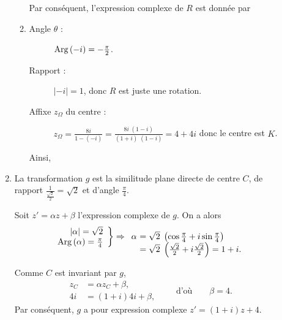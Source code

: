 \begin{description}
\begin{enumerate}
\begin{enumerate}
											Par cons\'equent, l'expression complexe de $R$ est donn\'ee par
									\item {}
												\begin{description}
													\item[Angle $\theta$ :] $\Arg{-i} = -\frac{\pi}{2}$.
													\item[Rapport :] $|-i| = 1$, donc $R$ est juste une rotation.
													\item[Affixe $z_\Omega$ du centre :]
														$z_\Omega = \frac{8i}{1-(-i)} = \frac{8i \; (1-i)}{(1+i)\;(1-i)} = 4 + 4i$
														donc le centre est $K$.
												\end{description}
												Ainsi, 
											
								\end{enumerate}
					\item {}
									La transformation $g$ est la similitude plane directe de centre $C$,
									de rapport $\frac{1}{\frac{\sqrt{2}}{2}}=\sqrt{2}$ et d'angle $\frac{\pi}{4}$.
									
										Soit $z'=\alpha z+\beta$ l'expression complexe de $g$.
										On a alors
										\[
										\left.
											\begin{array}{r}
												|\alpha| = \sqrt{2}				\\
												\Arg{\alpha} = \frac{\pi}{4}	
											\end{array}
										\right\rbrace
										\Rightarrow
										\begin{array}[t]{l@{\ }l}
												\alpha	& 	= \sqrt{2} \; \left( \cos \frac{\pi}{4} + i \sin \frac{\pi}{4} \right)		\\
														& 	= \sqrt{2} \; \left( \frac{\sqrt{2}}{2} + i \frac{\sqrt{2}}{2} \right)		
															= 1 + i.
										\end{array}
										\]
									
										Comme $C$ est invariant par $g$,
										\[
										\begin{aligned}
										z_C&=\alpha z_C+\beta,\\
										4i&=(1+i)4i+\beta,
										\end{aligned}
										\qquad\text{d'o\`u}\qquad \beta=4.
										\]
										Par cons\'equent, $g$ a pour expression complexe $z'=(1+i)z+4$.
					\end{enumerate}
	\end{description}
